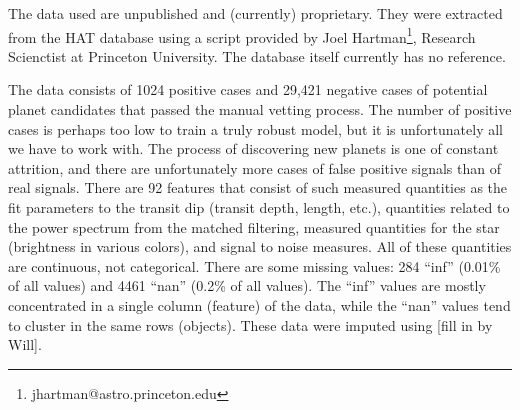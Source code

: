 The data used are unpublished and (currently) proprietary.  They were extracted from the HAT database using a script provided by Joel Hartman\footnote{jhartman@astro.princeton.edu}, Research Scienctist at Princeton University.  The database itself currently has no reference.

The data consists of 1024 positive cases and 29,421 negative cases of potential planet candidates that passed the manual vetting process.  The number of positive cases is perhaps too low to train a truly robust model, but it is unfortunately all we have to work with.  The process of discovering new planets is one of constant attrition, and there are unfortunately more cases of false positive signals than of real signals.  There are 92 features that consist of such measured quantities as the fit parameters to the transit dip (transit depth, length, etc.), quantities related to the power spectrum from the matched filtering, measured quantities for the star (brightness in various colors), and signal to noise measures.  All of these quantities are  continuous, not categorical.  There are some missing values: 284 ``inf'' (0.01\% of all values) and 4461 ``nan'' (0.2\% of all values).  The ``inf'' values are mostly concentrated in a single column (feature) of the data, while the ``nan'' values tend to cluster in the same rows (objects).  These data were imputed using [fill in by Will].